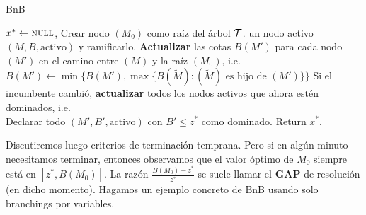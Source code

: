     
    \begin{algorithm}[H]
    	\caption{BnB}
    	\label{alg:bnb}
    	\begin{algorithmic}[1]
    		\State $x^*\gets \textsc{null}$, Crear nodo $(M_0)$ como raíz del árbol $\mathcal T$.
    		 un nodo activo $(M,B,\text{activo})$ y ramificarlo.
    		\State \textbf{Actualizar} las cotas $B(M')$ para cada nodo $(M')$ en el camino entre $(M)$ y la raíz $(M_0)$, i.e.\\
    		\qquad \qquad $B(M')\gets \min\{B(M'), \max\{B(\tilde{M})\colon (\tilde{M}) \text{ es hijo de } (M')\}\}$
    		\State Si el incumbente cambió, \textbf{actualizar} todos los nodos activos que ahora estén dominados, i.e.\\
    		\qquad \qquad Declarar todo $(M',B',\text{activo})$ con $B'\leq z^*$ como dominado.
    		\EndWhile
    		\State Return $x^*$.
    	\end{algorithmic}
    \end{algorithm} 
    
    Discutiremos luego criterios de terminación temprana. Pero si en algún minuto necesitamos terminar, entonces observamos que el valor óptimo de $M_0$ siempre está en $[z^*, B(M_0)]$. La razón $\frac{B(M_0)-z^*}{z^*}$ se suele llamar el \textbf{GAP} de resolución (en dicho momento). Hagamos un ejemplo concreto de BnB usando solo branchings por variables.    
    
